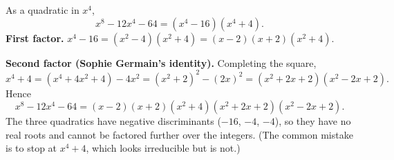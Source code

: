 As a quadratic in $x^4$,
\[x^8-12x^4-64=\left(x^4-16\right)\left(x^4+4\right).\]
\textbf{First factor.} $x^4-16=\left(x^2-4\right)\left(x^2+4\right)=(x-2)(x+2)\left(x^2+4\right)$.

\textbf{Second factor (Sophie Germain's identity).} Completing the square,
\[x^4+4=\left(x^4+4x^2+4\right)-4x^2=\left(x^2+2\right)^2-(2x)^2=\left(x^2+2x+2\right)\left(x^2-2x+2\right).\]
Hence
\[x^8-12x^4-64=\boxed{(x-2)(x+2)\left(x^2+4\right)\left(x^2+2x+2\right)\left(x^2-2x+2\right)}.\]
The three quadratics have negative discriminants ($-16$, $-4$, $-4$), so they have no real roots and cannot be factored further over the integers. (The common mistake is to stop at $x^4+4$, which looks irreducible but is not.)
